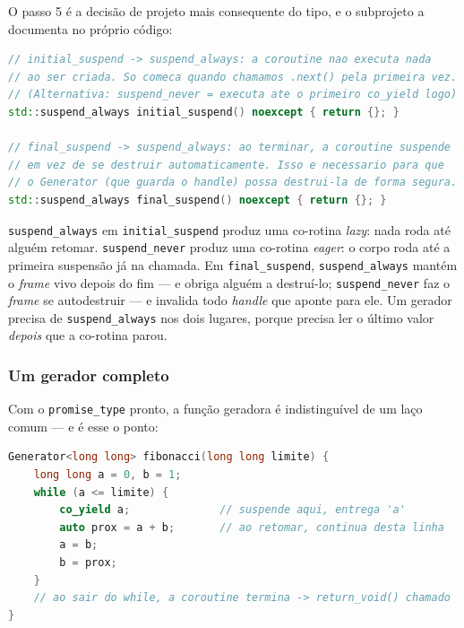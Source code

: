 O passo 5 é a decisão de projeto mais consequente do tipo, e o subprojeto a
documenta no próprio código:

\begin{lstlisting}[style=bt, language=C++,
    caption={As duas suspensões, em \texttt{src/coroutines/demo\_generator.hpp}.}]
// initial_suspend -> suspend_always: a coroutine nao executa nada
// ao ser criada. So comeca quando chamamos .next() pela primeira vez.
// (Alternativa: suspend_never = executa ate o primeiro co_yield logo)
std::suspend_always initial_suspend() noexcept { return {}; }

// final_suspend -> suspend_always: ao terminar, a coroutine suspende
// em vez de se destruir automaticamente. Isso e necessario para que
// o Generator (que guarda o handle) possa destrui-la de forma segura.
std::suspend_always final_suspend() noexcept { return {}; }
\end{lstlisting}

\begin{regra}
\texttt{suspend\_always} em \texttt{initial\_suspend} produz uma co-rotina
\emph{lazy}: nada roda até alguém retomar. \texttt{suspend\_never} produz uma
co-rotina \emph{eager}: o corpo roda até a primeira suspensão já na chamada.
Em \texttt{final\_suspend}, \texttt{suspend\_always} mantém o \emph{frame} vivo
depois do fim --- e obriga alguém a destruí-lo; \texttt{suspend\_never} faz o
\emph{frame} se autodestruir --- e invalida todo \emph{handle} que aponte para
ele. Um gerador precisa de \texttt{suspend\_always} nos dois lugares, porque
precisa ler o último valor \emph{depois} que a co-rotina parou.
\end{regra}

\subsubsection{Um gerador completo}

Com o \texttt{promise\_type} pronto, a função geradora é indistinguível de um
laço comum --- e é esse o ponto:

\begin{lstlisting}[style=bt, language=C++,
    caption={\texttt{src/coroutines/demo\_generator.hpp}: sequência finita, sem
             container nenhum.}]
Generator<long long> fibonacci(long long limite) {
    long long a = 0, b = 1;
    while (a <= limite) {
        co_yield a;              // suspende aqui, entrega 'a'
        auto prox = a + b;       // ao retomar, continua desta linha
        a = b;
        b = prox;
    }
    // ao sair do while, a coroutine termina -> return_void() chamado
}
\end{lstlisting}

